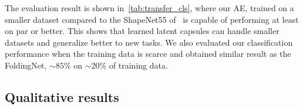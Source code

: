\documentclass[10pt,twocolumn,letterpaper]{article}
\theoremstyle{break}
\begin{document}
The evaluation result is shown in~\cref{tab:transfer_cls}, where our AE, trained on a smaller dataset compared to the ShapeNet55 of~\cite{achlioptas2017latent_pc,Yang_2018_CVPR} is capable of performing at least on par or better. This shows that learned latent capsules can handle smaller datasets and generalize better to new tasks. We also evaluated our classification performance when the training data is scarce and obtained similar result as the FoldingNet, $\sim85\%$ on $\sim20\%$ of training data.
\begin{table}[t!]
  \centering
  \caption{Part segmentation on ShapeNet-Part by learning only on the $x\%$ of the  training data.}
  \vspace{1pt}
  \vspace{-3mm}
\end{table}%
\subsection{Qualitative results}
\end{document}
